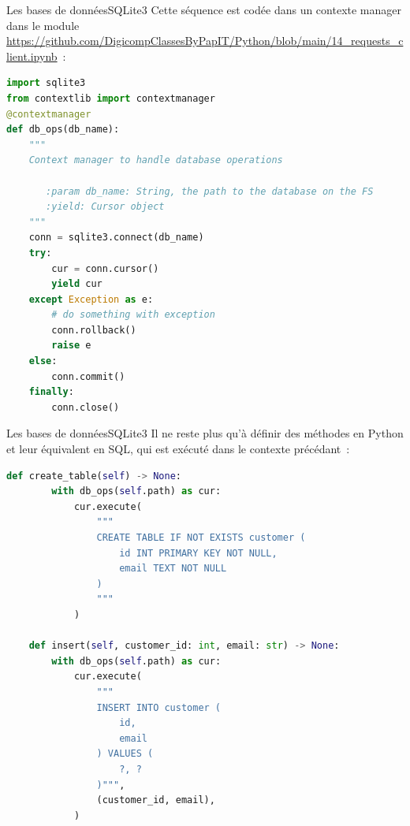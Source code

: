 \documentclass{beamer}
\begin{document}
    \begin{frame}[fragile]{Les bases de données}{SQLite3}
        Cette séquence est codée dans un contexte manager dans le module \url{https://github.com/DigicompClassesByPapIT/Python/blob/main/14_requests_client.ipynb}~:
        \begin{lstlisting}[language=Python,basicstyle=\tiny\ttfamily]
import sqlite3
from contextlib import contextmanager
@contextmanager
def db_ops(db_name):
    """
    Context manager to handle database operations

       :param db_name: String, the path to the database on the FS
       :yield: Cursor object
    """
    conn = sqlite3.connect(db_name)
    try:
        cur = conn.cursor()
        yield cur
    except Exception as e:
        # do something with exception
        conn.rollback()
        raise e
    else:
        conn.commit()
    finally:
        conn.close()
        \end{lstlisting}
    \end{frame}

    \begin{frame}[fragile]{Les bases de données}{SQLite3}
        Il ne reste plus qu'à définir des méthodes en Python et leur équivalent en SQL, qui est exécuté dans le contexte précédant~:
        \begin{lstlisting}[language=Python,basicstyle=\tiny\ttfamily]
    def create_table(self) -> None:
        with db_ops(self.path) as cur:
            cur.execute(
                """
                CREATE TABLE IF NOT EXISTS customer (
                    id INT PRIMARY KEY NOT NULL,
                    email TEXT NOT NULL
                )
                """
            )

    def insert(self, customer_id: int, email: str) -> None:
        with db_ops(self.path) as cur:
            cur.execute(
                """
                INSERT INTO customer (
                    id,
                    email
                ) VALUES (
                    ?, ?
                )""",
                (customer_id, email),
            )
        \end{lstlisting}
    \end{frame}
\end{document}
